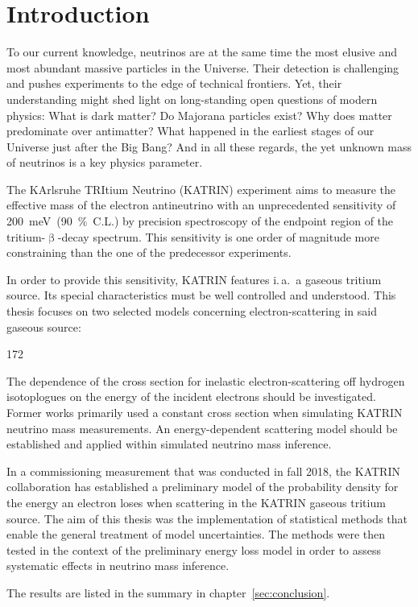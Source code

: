 \chapter{Introduction}
To our current knowledge, neutrinos are at the same time the most elusive and most abundant massive particles in the Universe. Their detection is challenging and pushes experiments to the edge of technical frontiers. Yet, their understanding might shed light on long-standing open questions of modern physics: What is dark matter? Do Majorana particles exist? Why does matter predominate over antimatter? What happened in the earliest stages of our Universe just after the Big Bang? And in all these regards, the yet unknown mass of neutrinos is a key physics parameter.

The KArlsruhe TRItium Neutrino (KATRIN) experiment aims to measure the effective mass of the electron antineutrino with an unprecedented sensitivity of \mbox{\SI{200}{meV} (\SI{90}{\percent} C.L.)} by precision spectroscopy of the endpoint region of the tritium-$\upbeta$-decay spectrum. This sensitivity is one order of magnitude more constraining than the one of the predecessor experiments.

In order to provide this sensitivity, KATRIN features i.\,a.~a gaseous tritium source. Its special characteristics must be well controlled and understood. This thesis focuses on two selected models concerning electron-scattering in said gaseous source: 
\begin{dingautolist}{172}
	\item\label{itm:introductionEDepCrossSec} The dependence of the cross section for inelastic electron-scattering off hydrogen isotoplogues on the energy of the incident electrons should be investigated. Former works primarily used a constant cross section when simulating KATRIN neutrino mass measurements. An energy-dependent scattering model should be established and applied within simulated neutrino mass inference.
	\item\label{itm:introductionKatrinEloss} In a commissioning measurement that was conducted in fall 2018, the KATRIN collaboration has established a preliminary model of the probability density for the energy an electron loses when scattering in the KATRIN gaseous tritium source. The aim of this thesis was the implementation of statistical methods that enable the general treatment of model uncertainties. The methods were then tested in the context of the preliminary energy loss model in order to assess systematic effects in neutrino mass inference.
\end{dingautolist}
The results are listed in the summary in chapter~\ref{sec:conclusion}.

